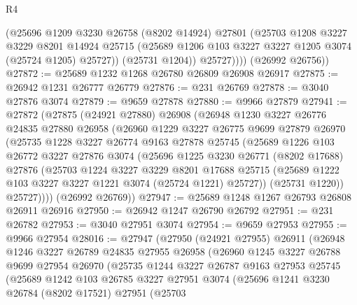 \begin{lexlean}{R4}
\begin{coremodule}
              (@25696
                @1209
                @3230
                @26758
                (@8202 @14924)
                @27801
                (@25703
                  @1208
                  @3227
                  @3229
                  @8201
                  @14924
                  @25715
                  (@25689 @1206 @103 @3227 @3227 @1205 @3074 (@25724 @1205) @25727))
                (@25731 @1204))
              @25727))))
      (@26992 @26756))
@27872 := @25689 @1232 @1268 @26780 @26809 @26908 @26917
@27875 := @26942 @1231 @26777 @26779
@27876 := @231 @26769
@27878 := @3040 @27876 @3074
@27879 := @9659 @27878
@27880 := @9966 @27879
@27941 := @27872
    (@27875
      (@24921 @27880)
      @26908
      (@26948
        @1230
        @3227
        @26776
        @24835
        @27880
        @26958
        (@26960
          @1229
          @3227
          @26775
          @9699
          @27879
          @26970
          (@25735
            @1228
            @3227
            @26774
            @9163
            @27878
            @25745
            (@25689
              @1226
              @103
              @26772
              @3227
              @27876
              @3074
              (@25696
                @1225
                @3230
                @26771
                (@8202 @17688)
                @27876
                (@25703
                  @1224
                  @3227
                  @3229
                  @8201
                  @17688
                  @25715
                  (@25689 @1222 @103 @3227 @3227 @1221 @3074 (@25724 @1221) @25727))
                (@25731 @1220))
              @25727))))
      (@26992 @26769))
@27947 := @25689 @1248 @1267 @26793 @26808 @26911 @26916
@27950 := @26942 @1247 @26790 @26792
@27951 := @231 @26782
@27953 := @3040 @27951 @3074
@27954 := @9659 @27953
@27955 := @9966 @27954
@28016 := @27947
    (@27950
      (@24921 @27955)
      @26911
      (@26948
        @1246
        @3227
        @26789
        @24835
        @27955
        @26958
        (@26960
          @1245
          @3227
          @26788
          @9699
          @27954
          @26970
          (@25735
            @1244
            @3227
            @26787
            @9163
            @27953
            @25745
            (@25689
              @1242
              @103
              @26785
              @3227
              @27951
              @3074
              (@25696
                @1241
                @3230
                @26784
                (@8202 @17521)
                @27951
                (@25703

\end{coremodule}
\end{lexlean}
